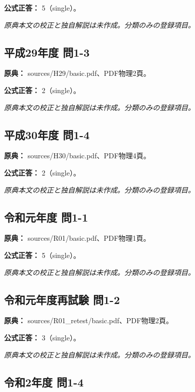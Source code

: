 \textbf{公式正答：} 5（single）。

\par\textit{原典本文の校正と独自解説は未作成。分類のみの登録項目。}

\subsection{平成29年度 問1-3}
\label{q:h29-reg-basic-1-3}

\noindent\textbf{原典：} sources/H29/basic.pdf、PDF物理2頁。

\textbf{公式正答：} 2（single）。

\par\textit{原典本文の校正と独自解説は未作成。分類のみの登録項目。}

\subsection{平成30年度 問1-4}
\label{q:h30-reg-basic-1-4}

\noindent\textbf{原典：} sources/H30/basic.pdf、PDF物理4頁。

\textbf{公式正答：} 2（single）。

\par\textit{原典本文の校正と独自解説は未作成。分類のみの登録項目。}

\subsection{令和元年度 問1-1}
\label{q:r01-reg-basic-1-1}

\noindent\textbf{原典：} sources/R01/basic.pdf、PDF物理1頁。

\textbf{公式正答：} 5（single）。

\par\textit{原典本文の校正と独自解説は未作成。分類のみの登録項目。}

\subsection{令和元年度再試験 問1-2}
\label{q:r01-ret-basic-1-2}

\noindent\textbf{原典：} sources/R01\_retest/basic.pdf、PDF物理2頁。

\textbf{公式正答：} 3（single）。

\par\textit{原典本文の校正と独自解説は未作成。分類のみの登録項目。}

\subsection{令和2年度 問1-4}
\label{q:r02-reg-basic-1-4}

